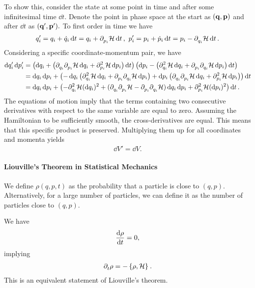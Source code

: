 To show this, consider the state at some point in time and after some infinitesimal time $\dd{t}$. Denote the point in phase space at the start as $(\vb{q}, \vb{p})$ and after $\dd{t}$ as $(\vb{q}', \vb{p}').$ To first order in time we have
\begin{align*}
q_{i}' = q_{i} + \dot{q}_{i}\dd{t} = q_{i} + \del{p_{i}}{\ham}\dd{t},\ p_{i}' = p_{i} + \dot{p}_{i}\dd{t} = p_{i} - \del{q_{i}}{\ham}\dd{t}.
\end{align*}
Considering a specific coordinate-momentum pair, we have
\begin{align*}
	\dd{q_{i}'}\dd{p_{i}'} &= \left(\dd{q_{i}} +  \left(\del{q_{i}}{\del{p_{i}}{\ham}}\dd{q_{i}} + \del[2]{p_{i}}{\ham}\dd{p_{i}}\right)\dd{t}\right)\left(\dd{p_{i}} -  \left(\del[2]{q_{i}}{\ham}\dd{q_{i}} + \del{p_{i}}{\del{q_{i}}{\ham}}\dd{p_{i}}\right)\dd{t}\right) \\
                           &= \dd{q_{i}}\dd{p_{i}} + \left(-\dd{q_{i}}\left(\del[2]{q_{i}}{\ham}\dd{q_{i}} + \del{p_{i}}{\del{q_{i}}{\ham}}\dd{p_{i}}\right) + \dd{p_{i}\left(\del{q_{i}}{\del{p_{i}}{\ham}}\dd{q_{i}} + \del[2]{p_{i}}{\ham}\dd{p_{i}}\right)}\right)\dd{t} \\
                           &= \dd{q_{i}}\dd{p_{i}} + \left(-\del[2]{q_{i}}{\ham}(\dd{q_{i}})^{2} + (\del{q_{i}}{\del{p_{i}}{\ham}} - \del{p_{i}}{\del{q_{i}}{\ham}})\dd{q_{i}}\dd{p_{i}} + \del[2]{p_{i}}{\ham}(\dd{p_{i}})^{2}\right)\dd{t}.
\end{align*}
The equations of motion imply that the terms containing two consecutive derivatives with respect to the same variable are equal to zero. Assuming the Hamiltonian to be sufficiently smooth, the cross-derivatives are equal. This means that this specific product is preserved. Multiplying them up for all coordinates and momenta yields
\begin{align*}
	\dd{V}' = \dd{V}.
\end{align*}

\paragraph{Liouville's Theorem in Statistical Mechanics}
We define $\rho(q, p, t)$ as the probability that a particle is close to $(q, p)$. Alternatively, for a large number of particles, we can define it as the number of particles close to $(q, p)$.

We have
\begin{align*}
	\dv{\rho}{t} = 0,
\end{align*}
implying
\begin{align*}
	\del{t}{\rho} = -\pob{\rho}{\ham}.
\end{align*}
This is an equivalent statement of Liouville's theorem.

